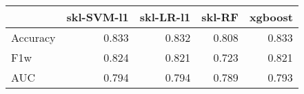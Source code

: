 \begin{tabular}{lrrrr}
\toprule
{} &  skl-SVM-l1 &  skl-LR-l1 &  skl-RF &  xgboost \\
\midrule
Accuracy &       0.833 &      0.832 &   0.808 &    0.833 \\
F1w      &       0.824 &      0.821 &   0.723 &    0.821 \\
AUC      &       0.794 &      0.794 &   0.789 &    0.793 \\
\bottomrule
\end{tabular}
